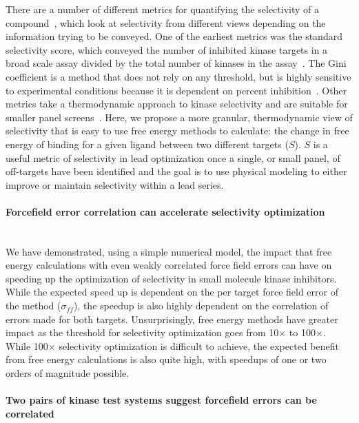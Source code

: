 \documentclass[phd,tocprelim]{cornell}
\begin{document}
There are a number of different metrics for quantifying the selectivity of a compound~\citep{Bosc:2017gs}, which look at selectivity from different views depending on the information trying to be conveyed. 
One of the earliest metrics was the standard selectivity score, which conveyed the number of inhibited kinase targets in a broad scale assay divided by the total number of kinases in the assay~\citep{Davis2011-dz}. 
The Gini coefficient is a method that does not rely on any threshold, but is highly sensitive to experimental conditions because it is dependent on percent inhibition~\citep{Graczyk:2007bm}. Other metrics take a thermodynamic approach to kinase selectivity and are suitable for smaller panel screens~\citep{DuongLy:2016iha,Uitdehaag:2011ea}. Here, we propose a more granular, thermodynamic  view of selectivity that is easy to use free energy methods to calculate: the change in free energy of binding for a given ligand between two different targets ($S$). 
$S$ is a useful metric of selectivity in lead optimization once a single, or small panel, of off-targets have been identified and the goal is to use physical modeling to either improve or maintain selectivity within a lead series. 

\paragraph{Forcefield error correlation can accelerate selectivity optimization} \mbox{}\\


We have demonstrated, using a simple numerical model, the impact that free energy calculations with even weakly correlated force field errors can have on speeding up the optimization of selectivity in small molecule kinase inhibitors. 
While the expected speed up is dependent on the per target force field error of the method ($\sigma_{ff}$), the speedup is also highly dependent on the correlation of errors made for both targets. 
Unsurprisingly, free energy methods have greater impact as the threshold for selectivity optimization goes from 10$\times$ to 100$\times$. 
While 100$\times$ selectivity optimization is difficult to achieve, the expected benefit from free energy calculations is also quite high, with speedups of one or two orders of magnitude possible. 

\paragraph{Two pairs of kinase test systems suggest forcefield errors can be correlated} \mbox{}\\
\end{document}
